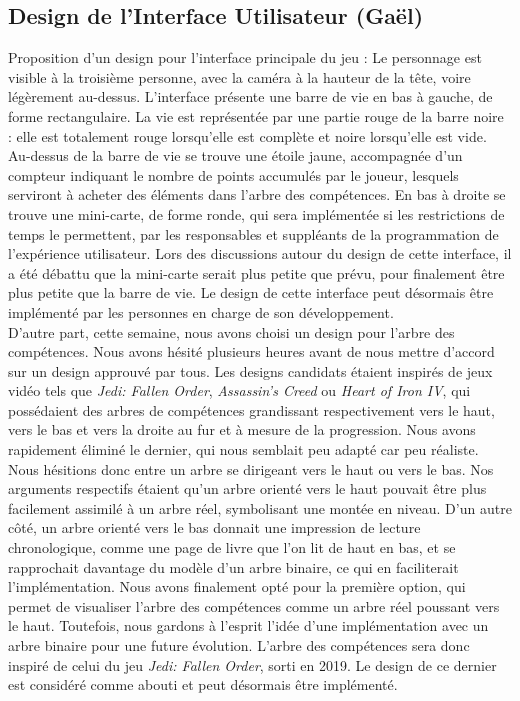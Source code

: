 \documentclass{report}
\begin{document}
\subsection*{Design de l'Interface Utilisateur (Gaël)}
Proposition d'un design pour l'interface principale du jeu :
Le personnage est visible à la troisième personne, avec la caméra à la hauteur de la tête, voire légèrement au-dessus. L'interface présente une barre de vie en bas à gauche, de forme rectangulaire. La vie est représentée par une partie rouge de la barre noire : elle est totalement rouge lorsqu'elle est complète et noire lorsqu'elle est vide. Au-dessus de la barre de vie se trouve une étoile jaune, accompagnée d'un compteur indiquant le nombre de points accumulés par le joueur, lesquels serviront à acheter des éléments dans l'arbre des compétences. En bas à droite se trouve une mini-carte, de forme ronde, qui sera implémentée si les restrictions de temps le permettent, par les responsables et suppléants de la programmation de l'expérience utilisateur. Lors des discussions autour du design de cette interface, il a été débattu que la mini-carte serait plus petite que prévu, pour finalement être plus petite que la barre de vie. Le design de cette interface peut désormais être implémenté par les personnes en charge de son développement.
\\[0.4cm]
D'autre part, cette semaine, nous avons choisi un design pour l'arbre des compétences. Nous avons hésité plusieurs heures avant de nous mettre d'accord sur un design approuvé par tous. Les designs candidats étaient inspirés de jeux vidéo tels que  \textit{Jedi: Fallen Order}, \textit{Assassin's Creed} ou \textit{Heart of Iron IV}, qui possédaient des arbres de compétences grandissant respectivement vers le haut, vers le bas et vers la droite au fur et à mesure de la progression. Nous avons rapidement éliminé le dernier, qui nous semblait peu adapté car peu réaliste. Nous hésitions donc entre un arbre se dirigeant vers le haut ou vers le bas. Nos arguments respectifs étaient qu’un arbre orienté vers le haut pouvait être plus facilement assimilé à un arbre réel, symbolisant une montée en niveau. D’un autre côté, un arbre orienté vers le bas donnait une impression de lecture chronologique, comme une page de livre que l’on lit de haut en bas, et se rapprochait davantage du modèle d’un arbre binaire, ce qui en faciliterait l'implémentation. Nous avons finalement opté pour la première option, qui permet de visualiser l’arbre des compétences comme un arbre réel poussant vers le haut. Toutefois, nous gardons à l'esprit l’idée d’une implémentation avec un arbre binaire pour une future évolution. L’arbre des compétences sera donc inspiré de celui du jeu \textit{Jedi: Fallen Order}, sorti en 2019. Le design de ce dernier est considéré comme abouti et peut désormais être implémenté.
\end{document}
